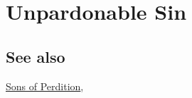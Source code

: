 \section{Unpardonable Sin}
	\label{UNPARDONABLESIN}
	
\subsection{See also}

	\hyperref[SONSOFPERDITION]{Sons of Perdition}, 






	
	
